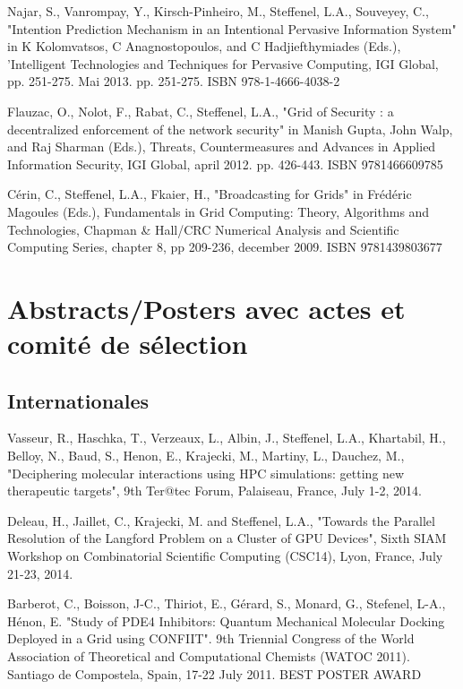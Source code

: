 \documentclass[final,twoside]{hdr} %
\begin{document}
Najar, S., Vanrompay, Y., Kirsch-Pinheiro, M., Steffenel, L.A., Souveyey, C., "Intention Prediction Mechanism in an Intentional Pervasive Information System" in K Kolomvatsos, C Anagnostopoulos, and C Hadjiefthymiades (Eds.), 'Intelligent Technologies and Techniques for Pervasive Computing, IGI Global, pp. 251-275. Mai 2013. pp. 251-275. ISBN 978-1-4666-4038-2

Flauzac, O., Nolot, F., Rabat, C., Steffenel, L.A., "Grid of Security : a decentralized enforcement of the network security" in Manish Gupta, John Walp, and Raj Sharman (Eds.), Threats, Countermeasures and Advances in Applied Information Security, IGI Global, april 2012. pp. 426-443. ISBN 9781466609785

Cérin, C., Steffenel, L.A., Fkaier, H., "Broadcasting for Grids" in Frédéric Magoules (Eds.), Fundamentals in Grid Computing: Theory, Algorithms and Technologies, Chapman \& Hall/CRC Numerical Analysis and Scientific Computing Series, chapter 8, pp 209-236, december 2009. ISBN 9781439803677

\section*{Abstracts/Posters avec actes et comité de sélection}

\subsection*{Internationales}

Vasseur, R., Haschka, T., Verzeaux, L., Albin, J., Steffenel, L.A., Khartabil, H., Belloy, N., Baud, S., Henon, E., Krajecki, M., Martiny, L., Dauchez, M., "Deciphering molecular interactions using HPC simulations: getting new therapeutic targets", 9th Ter@tec Forum, Palaiseau, France, July 1-2, 2014.

Deleau, H., Jaillet, C., Krajecki, M. and Steffenel, L.A., "Towards the Parallel Resolution of the Langford Problem on a Cluster of GPU Devices", Sixth SIAM Workshop on Combinatorial Scientific Computing (CSC14), Lyon, France, July 21-23, 2014.

Barberot, C., Boisson, J-C., Thiriot, E., Gérard, S., Monard, G., Stefenel, L-A., Hénon, E. "Study of PDE4 Inhibitors: Quantum Mechanical Molecular Docking Deployed in a Grid using CONFIIT". 9th Triennial Congress of the World Association of Theoretical and Computational Chemists (WATOC 2011). Santiago de Compostela, Spain, 17-22 July 2011. BEST POSTER AWARD
\end{document}
